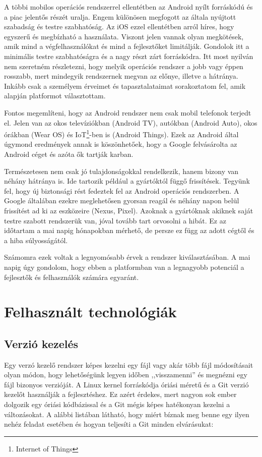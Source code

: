 \documentclass{thesis-ekf}
\theoremstyle{definition}
\theoremstyle{remark}
\begin{document}
A többi mobilos operációs rendszerrel ellentétben az Android nyílt forráskódú és a piac jelentős részét uralja.
Engem különösen megfogott az általa nyújtott szabadság és testre szabhatóság.
Az iOS ezzel ellentétben arról híres, hogy egyszerű és megbízható a használata.
Viszont jelen vannak olyan megkötések, amik mind a végfelhasználókat és mind a fejlesztőket limitálják.
Gondolok itt a minimális testre szabhatóságra és a nagy részt zárt forráskódra.
Itt most nyilván nem szeretném részletezni, hogy melyik operációs rendszer a jobb vagy éppen rosszabb, mert mindegyik rendszernek megvan az előnye, illetve a hátránya.
Inkább csak a személyem érveimet és tapasztalataimat sorakoztatom fel, amik alapján platformot választottam.


Fontos megemlíteni, hogy az Android rendszer nem csak mobil telefonok terjedt el.
Jelen van az okos televíziókban (Android TV), autókban (Android Auto), okos órákban (Wear OS) és IoT\footnote{Internet of Things}-ben is (Android Things).
Ezek az Android által úgymond eredmények annak is köszönhetőek, hogy a Google felvásárolta az Android céget és azóta ők tartják karban.

Természetesen nem csak jó tulajdonságokkal rendelkezik, hanem bizony van néhány hátránya is.
Ide tartozik például a gyártóktól függő frissítések. Tegyünk fel, hogy új biztonsági rést fedeztek fel az Android operációs rendszerben.
A Google általában ezekre meglehetősen gyorsan reagál és néhány napon belül frissítést ad ki az eszközeire (Nexus, Pixel).
Azoknak a gyártóknak akiknek saját testre szabott rendszerük van, jóval tovább tart orvosolni a hibát.
Ez az időtartam a mai napig hónapokban mérhető, de persze ez függ az adott cégtől és a hiba súlyosságától. 

Számomra ezek voltak a legnyomósabb érvek a rendszer kiválasztásában.
A mai napig úgy gondolom, hogy ebben a platformban van a legnagyobb potenciál a fejlesztők és felhasználók számára egyaránt.

\chapter{Felhasznált technológiák}\label{technologiak}

\section{Verzió kezelés}

Egy verzó kezelő rendszer képes kezelni egy fájl vagy akár több fájl módosításait olyan módon, hogy lehetőségünk legyen időben ,,visszamenni'' és megnézni egy fájl bizonyos verzióját.
A Linux kernel forráskódja óriási méretű és a Git verzió kezelőt használják a fejlesztéshez.
Ez azért érdekes, mert nagyon sok ember dolgozik egy óriási kódbázissal és a Git mégis képes hatékonyan kezelni a változásokat.
A alábbi listában látható, hogy miért bíznak meg benne egy ilyen nehéz feladat esetében és hogyan teljesíti a Git minden elvárásukat:
\end{document}
